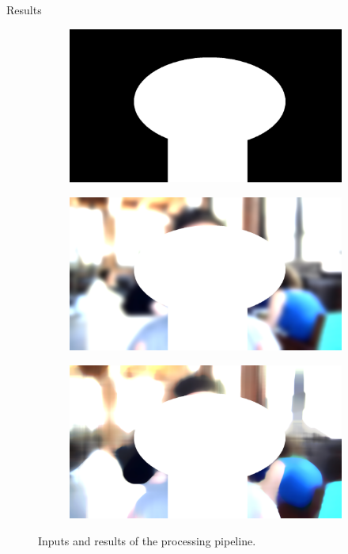 \documentclass[aspectratio=169,t,xcolor={dvipsnames}]{beamer}
\begin{document}
\begin{frame}{Results}
\begin{figure}[h]
\begin{subfigure}{.3\textwidth}
        \label{subfig:input}
    \end{subfigure}\hfill
    \medskip
    \begin{subfigure}{.3\textwidth}
        \centering
        \includegraphics[width=0.9\linewidth]{../../python/mask_big}
        \label{subfig:input}
    \end{subfigure}\hfill
    \begin{subfigure}{.3\textwidth}
        \centering
        \includegraphics[width=0.9\linewidth]{../../python/or_gauss_81}
        \label{subfig:input}
    \end{subfigure}\hfill
    \begin{subfigure}{.3\textwidth}
        \centering
        \includegraphics[width=0.9\linewidth]{../../python/or_median_81}
        \label{subfig:input}
    \end{subfigure}\hfill
    \caption{Inputs and results of the processing pipeline.}%
    \label{fig:images}%
\end{figure}
\end{frame}
\end{document}
